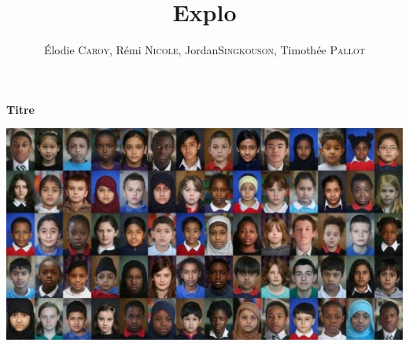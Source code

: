 \documentclass[12pt]{book}
\title{Explo}
\author{\'Elodie \textsc{Caroy}, Rémi \textsc{Nicole}, Jordan\textsc{Singkouson}, Timothée \textsc{Pallot}}
\date{}
\begin{document}
\begin{titlepage}
	\begin{sffamily}
	\begin{center}

	\vspace{\fill}
	
	{\huge \bfseries Titre \\[0.4cm]}
	\vspace{\fill}
	
	\includegraphics[scale=0.8]{races-620x330.jpg}
	
	
	\end{center}
	\end{sffamily}
\end{titlepage}
	

\tableofcontents









\end{document}
